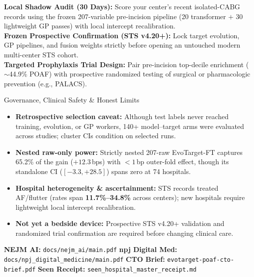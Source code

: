 \documentclass[8.8pt,letterpaper]{article}
\begin{document}
\vspace{4pt}

\noindent
\begin{minipage}[t]{0.478\textwidth}
  \vspace{0pt}
  \vspace{1.5pt}
  {\fontsize{7.8}{9.8}\selectfont
  \;\textbf{Local Shadow Audit (30 Days):} Score your center's recent isolated-CABG records using the frozen 207-variable pre-incision pipeline (20 transformer $+$ 30 lightweight GP passes) with local intercept recalibration.\\[4.2pt]
  \;\textbf{Frozen Prospective Confirmation (STS v4.20+):} Lock target evolution, GP pipelines, and fusion weights strictly before opening an untouched modern multi-center STS cohort.\\[4.2pt]
  \;\textbf{Targeted Prophylaxis Trial Design:} Pair pre-incision top-decile enrichment ($\sim$44.9\% POAF) with prospective randomized testing of surgical or pharmacologic prevention (e.g., PALACS).}
\end{minipage}\hfill
\begin{minipage}[t]{0.494\textwidth}
  \vspace{0pt}
  \begin{govbox}{Governance, Clinical Safety \& Honest Limits}
    \begin{itemize}[leftmargin=1.1em,itemsep=1.5pt,topsep=1pt]
      \item \textbf{Retrospective selection caveat:} Although test labels never reached training, evolution, or GP workers, 140+ model--target arms were evaluated across studies; cluster CIs condition on selected runs.
      \item \textbf{Nested raw-only power:} Strictly nested 207-raw EvoTarget-FT captures 65.2\% of the gain ($+12.3$\,bps) with $<1$\,bp outer-fold effect, though its standalone CI ($[-3.3, +28.5]$) spans zero at 74 hospitals.
      \item \textbf{Hospital heterogeneity \& ascertainment:} STS  records treated AF/flutter (rates span \textbf{11.7\%--34.8\%} across centers); new hospitals require lightweight local intercept recalibration.
      \item \textbf{Not yet a bedside device:} Prospective STS v4.20+ validation and randomized trial confirmation are required before changing clinical care.
    \end{itemize}
  \end{govbox}
\end{minipage}

%
  {\textbf{NEJM AI:} \texttt{docs/nejm\_ai/main.pdf} \;\textbar\; \textbf{npj Digital Med:} \texttt{docs/npj\_digital\_medicine/main.pdf} \;\textbar\; \textbf{CTO Brief:} \texttt{evotarget-poaf-cto-brief.pdf} \;\textbar\; \textbf{Seen Receipt:} \texttt{seen\_hospital\_master\_receipt.md}}%
  {\repourl}
\end{document}

